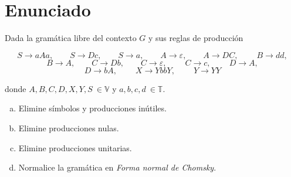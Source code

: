 \documentclass[10pt,a4paper,spanish]{report}
\begin{document}
\section{\textcolor{p9}Enunciado}

Dada la gramática libre del contexto $G$ y sus reglas de producción

\begin{displaymath}
    S \rightarrow aAa, \qquad S \rightarrow Dc, \qquad S \rightarrow a, \qquad A \rightarrow \varepsilon, \qquad A \rightarrow DC, \qquad\  B \rightarrow dd,
\end{displaymath}
\begin{displaymath}
    B \rightarrow A, \qquad C \rightarrow Db, \qquad C \rightarrow \varepsilon, \qquad\ C \rightarrow c, \qquad\ D \rightarrow A, 
\end{displaymath}
\begin{displaymath}
    D \rightarrow bA, \qquad\ X \rightarrow YbbY, \qquad\ Y \rightarrow YY
\end{displaymath}

donde $A,B,C,D,X,Y,S~\in \mathbb{V}$ y $a,b,c,d~\in \mathbb{T}$.

\begin{enumerate}[a)]
    \item Elimine símbolos y producciones inútiles.
    \item Elimine producciones nulas.
    \item Elimine producciones unitarias.
    \item Normalice la gramática en \textit{Forma normal de Chomsky}.
\end{enumerate}
\end{document}

